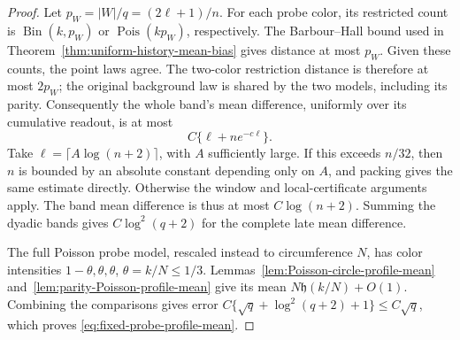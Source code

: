 \documentclass[11pt,letterpaper]{article}
\begin{document}
\begin{proof}
Let $p_W=|W|/q=(2\ell+1)/n$.
For each probe color, its restricted count is
$\operatorname{Bin}(k,p_W)$ or
$\operatorname{Pois}(kp_W)$, respectively.
The Barbour--Hall bound used in
Theorem~\ref{thm:uniform-history-mean-bias} gives distance
at most $p_W$. Given these counts, the point laws agree.
The two-color restriction distance is therefore at most
$2p_W$; the original background law is shared by the two
models, including its parity.
Consequently the whole band's mean difference, uniformly
over its cumulative readout, is at most
\[
 C\{\ell+n e^{-c\ell}\}.
\]
Take $\ell=\lceil A\log(n+2)\rceil$, with $A$ sufficiently
large. If this exceeds $n/32$, then $n$ is bounded by
an absolute constant depending only on $A$, and packing
gives the same estimate directly.
Otherwise the window and local-certificate arguments apply.
The band mean difference is thus at most $C\log(n+2)$.
Summing the dyadic bands gives
$C\log^2(q+2)$ for the complete late mean difference.

The full Poisson probe model, rescaled instead to
circumference $N$, has color intensities
$1-\theta,\theta,\theta$, $\theta=k/N\le1/3$.
Lemmas~\ref{lem:Poisson-circle-profile-mean}
and~\ref{lem:parity-Poisson-profile-mean} give its mean
$N\mathfrak h(k/N)+O(1)$.
Combining the comparisons gives error
$C\{\sqrt q+\log^2(q+2)+1\}\le C\sqrt q$,
which proves \eqref{eq:fixed-probe-profile-mean}.
\end{proof}
\end{document}
